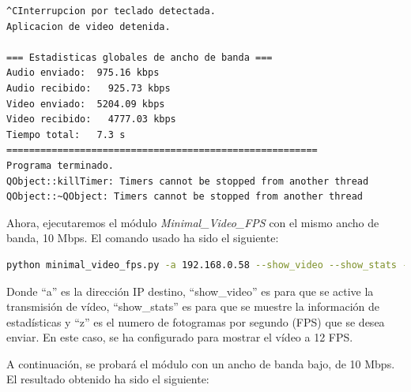 \begin{lstlisting}[language=bash,basicstyle=\ttfamily\scriptsize]
^CInterrupcion por teclado detectada.
Aplicacion de video detenida.

=== Estadisticas globales de ancho de banda ===
Audio enviado:	975.16 kbps
Audio recibido:   925.73 kbps
Video enviado:	5204.09 kbps
Video recibido:   4777.03 kbps
Tiempo total: 	7.3 s
=======================================================
Programa terminado.
QObject::killTimer: Timers cannot be stopped from another thread
QObject::~QObject: Timers cannot be stopped from another thread
\end{lstlisting}
\vspace{\baselineskip}

\newpage

Ahora, ejecutaremos el módulo \textit{Minimal\_Video\_FPS} con el mismo ancho de banda, 10 Mbps. El comando usado ha sido el siguiente:
\begin{lstlisting}[language=bash, basicstyle=\ttfamily\scriptsize]
    python minimal_video_fps.py -a 192.168.0.58 --show_video --show_stats -z 12
\end{lstlisting}
Donde ``a'' es la dirección IP destino, ``show\_video'' es para que se active la transmisión de vídeo, ``show\_stats'' es para que se muestre la información de estadísticas y ``z'' es el numero de fotogramas por segundo (FPS) que se desea enviar. En este caso, se ha configurado para mostrar el vídeo a 12 FPS.

A continuación, se probará el módulo con un ancho de banda bajo, de 10 Mbps. El resultado obtenido ha sido el siguiente:
\vspace{\baselineskip}

